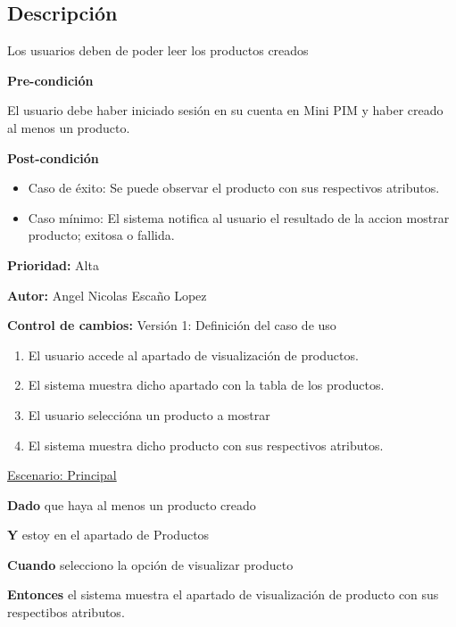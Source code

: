 {}

\subsection*{Descripción}
Los usuarios deben de poder leer los productos creados\par
\vspace{0.15cm}

\textbf{Pre-condición}\par
El usuario debe haber iniciado sesión en su cuenta en Mini PIM y haber creado al menos un producto.\par
\vspace{0.15cm}

\textbf{Post-condición}
\begin{itemize}
    \item Caso de éxito: Se puede observar el producto con sus respectivos atributos.
    \item Caso mínimo: El sistema notifica al usuario el resultado de la accion mostrar producto; exitosa o fallida.
\end{itemize}

\textbf{Prioridad: }
Alta
\vspace{0.15cm}

\textbf{Autor: }
Angel Nicolas Escaño Lopez\par
\vspace{0.15cm}

\textbf{Control de cambios: } Versión 1: Definición del caso de uso

\begin{enumerate}
    \item El usuario accede al apartado de visualización de productos.
    \item El sistema muestra dicho apartado con la tabla de los productos.
    \item El usuario seleccióna un producto a mostrar
    \item El sistema muestra dicho producto con sus respectivos atributos.
\end{enumerate}

\underline{Escenario: Principal}\par
\vspace{0.15cm}
\textbf{Dado} que haya al menos un producto creado\par
\textbf{Y} estoy en el apartado de Productos\par
\textbf{Cuando} selecciono la opción de visualizar producto\par
\textbf{Entonces} el sistema muestra el apartado de visualización de producto con sus respectibos atributos.\par
\vspace{0.20cm}

